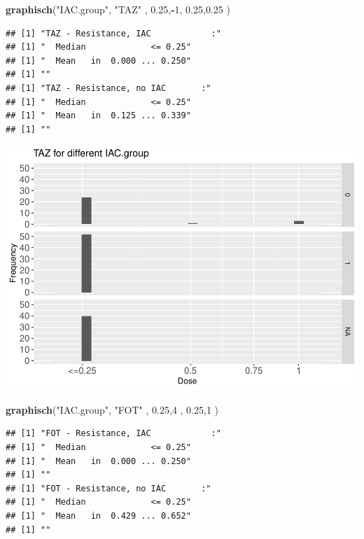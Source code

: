 \documentclass[
]{article}
\newenvironment{Shaded}{\begin{snugshade}}{\end{snugshade}}
\newcommand{\DecValTok}[1]{\textcolor[rgb]{0.00,0.00,0.81}{#1}}
\newcommand{\FloatTok}[1]{\textcolor[rgb]{0.00,0.00,0.81}{#1}}
\newcommand{\KeywordTok}[1]{\textcolor[rgb]{0.13,0.29,0.53}{\textbf{#1}}}
\newcommand{\NormalTok}[1]{#1}
\newcommand{\OperatorTok}[1]{\textcolor[rgb]{0.81,0.36,0.00}{\textbf{#1}}}
\newcommand{\StringTok}[1]{\textcolor[rgb]{0.31,0.60,0.02}{#1}}
\begin{document}
\begin{Shaded}
\begin{Highlighting}[]
   \KeywordTok{graphisch}\NormalTok{(}\StringTok{"IAC.group"}\NormalTok{, }\StringTok{"TAZ"}\NormalTok{ , }\FloatTok{0.25}\NormalTok{,}\OperatorTok{-}\DecValTok{1}\NormalTok{,   }\FloatTok{0.25}\NormalTok{,}\FloatTok{0.25}\NormalTok{ )  }
\end{Highlighting}
\end{Shaded}

\begin{verbatim}
## [1] "TAZ - Resistance, IAC            :"
## [1] "  Median             <= 0.25"
## [1] "  Mean   in  0.000 ... 0.250"
## [1] ""
## [1] "TAZ - Resistance, no IAC       :"
## [1] "  Median             <= 0.25"
## [1] "  Mean   in  0.125 ... 0.339"
## [1] ""
\end{verbatim}

\includegraphics{Verteilungen_files/figure-latex/unnamed-chunk-11-1.pdf}

\begin{Shaded}
\begin{Highlighting}[]
  \KeywordTok{graphisch}\NormalTok{(}\StringTok{"IAC.group"}\NormalTok{, }\StringTok{"FOT"}\NormalTok{ , }\FloatTok{0.25}\NormalTok{,}\DecValTok{4}\NormalTok{   ,   }\FloatTok{0.25}\NormalTok{,}\DecValTok{1}\NormalTok{     )  }
\end{Highlighting}
\end{Shaded}

\begin{verbatim}
## [1] "FOT - Resistance, IAC            :"
## [1] "  Median             <= 0.25"
## [1] "  Mean   in  0.000 ... 0.250"
## [1] ""
## [1] "FOT - Resistance, no IAC       :"
## [1] "  Median             <= 0.25"
## [1] "  Mean   in  0.429 ... 0.652"
## [1] ""
\end{verbatim}
\end{document}
